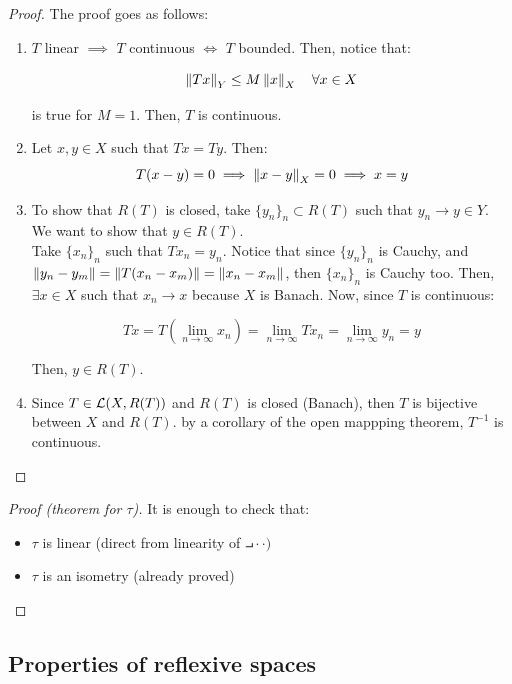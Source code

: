 \begin{proof}
    The proof goes as follows:
    \begin{enumerate}[label=(\roman*)]
        \item $T$ linear $\implies$ $T$ continuous $\iff$ $T$ bounded. 
        Then, notice that:

        $$\left\|Tx\right\|_Y \leq M \left\|x\right\|_X \quad \forall x \in X$$

        is true for $M = 1$. Then, $T$ is continuous.

        \item Let $x, y \in X$ such that $Tx = Ty$. Then:
        $$T(x - y) = 0 \implies \left\|x-y\right\|_X = 0 \implies x = y$$

        \item To show that $R(T)$ is closed, take $\{y_n\}_n \subset R(T)$ such that
        $y_n \to y \in Y$.  We want to show that $y \in R(T)$.\\

        Take $\{x_n\}_n$ such that $Tx_n = y_n$. Notice that
        since $\{y_n\}_n$ is Cauchy, and $\left\|y_n - y_m\right\| = \left\|T(x_n - x_m)\right\| = \left\|x_n - x_m\right\|$,
        then $\{x_n\}_n$ is Cauchy too. Then, $\exists x \in X$ such that $x_n \to x$
        because $X$ is Banach. Now, since $T$ is continuous:

        $$Tx = T(\lim_{n \to \infty} x_n) = \lim_{n \to \infty} Tx_n = \lim_{n \to \infty} y_n = y$$

        Then, $y \in R(T)$.

        \item Since $T \in \mathcal{L}(X, R(T))$ and $R(T)$ is closed (Banach), then
        $T$ is bijective between $X$ and $R(T)$. by a corollary of
        the open mappping theorem, $T^{-1}$ is continuous.
    \end{enumerate}
\end{proof}

\begin{proof}[Proof (theorem for $\tau$)]
    It is enough to check that:
    \begin{itemize}
        \item $\tau$ is linear (direct from linearity of $\intprod{\cdot}{\cdot})$
        \item $\tau$ is an isometry (already proved)
    \end{itemize}

\end{proof}

\subsection{Properties of reflexive spaces}

